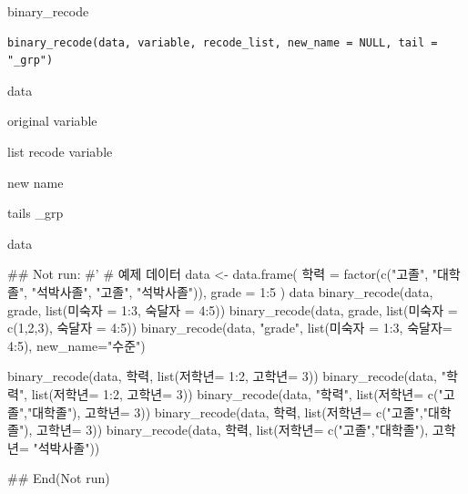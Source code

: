 \documentclass[a4paper]{book}
\begin{document}
%
\begin{Description}
binary\_recode
\end{Description}
%
\begin{Usage}
\begin{verbatim}
binary_recode(data, variable, recode_list, new_name = NULL, tail = "_grp")
\end{verbatim}
\end{Usage}
%
\begin{Arguments}
\begin{ldescription}
\item[\code{data}] data

\item[\code{variable}] original variable

\item[\code{recode\_list}] list recode variable

\item[\code{new\_name}] new name

\item[\code{tail}] tails \_grp
\end{ldescription}
\end{Arguments}
%
\begin{Value}
data
\end{Value}
%
\begin{Examples}
\begin{ExampleCode}

\#\# Not run: 
#'
# 예제 데이터
data <- data.frame(
  학력 = factor(c("고졸", "대학졸", "석박사졸", "고졸", "석박사졸")),
  grade = 1:5
)
data
binary_recode(data, grade, list(미숙자 = 1:3, 숙달자 = 4:5))
binary_recode(data, grade, list(미숙자 = c(1,2,3), 숙달자 = 4:5))
binary_recode(data, "grade", list(미숙자 = 1:3, 숙달자= 4:5), new_name="수준")

binary_recode(data, 학력, list(저학년= 1:2, 고학년= 3))
binary_recode(data, "학력", list(저학년= 1:2, 고학년= 3))
binary_recode(data, "학력", list(저학년= c("고졸","대학졸"), 고학년= 3))
binary_recode(data, 학력, list(저학년= c("고졸","대학졸"), 고학년= 3))
binary_recode(data, 학력, list(저학년= c("고졸","대학졸"), 고학년= "석박사졸"))


## End(Not run)

\end{ExampleCode}
\end{Examples}
\end{document}
